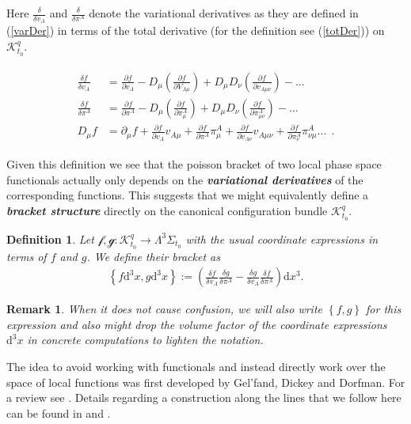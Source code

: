\documentclass[a4paper,12pt, DIV=14, BCOR=5mm, twoside, headsepline, numbers=noenddot]{scrbook}
\newtheorem{definition}{Definition}[section]
\newtheorem*{remark}{Remark}
\begin{document}
Here $\frac{\delta}{\delta v_A}$ and $\frac{\delta}{\delta \pi^A}$ denote the variational derivatives as they are defined in (\ref{varDer}) in terms of the total derivative (for the definition see (\ref{totDer})) on $\mathcal{K}^q_{t_0}$.

\begin{align}
    \begin{aligned}
    \frac{\delta f}{\delta v_A} &= \frac{\partial f}{\partial v_A} - D_{\mu}(\frac{\partial f}{\partial V_{A\mu}}) + D_{\mu}D_{\nu} (\frac{\partial f}{\partial v_{A\mu\nu}}) - ... \\
    \frac{\delta f}{\delta \pi^A} &= \frac{\partial f}{\partial \pi^A} - D_{\mu}(\frac{\partial f}{\partial \pi^{A}_{\mu}}) + D_{\mu}D_{\nu} (\frac{\partial f}{\partial \pi^{A}_{\mu\nu}}) - ... \\
    D_\mu f &= \partial _\mu f + \frac{\partial f}{\partial v_A} v_{A\mu} + \frac{\partial f}{\partial \pi^A } \pi ^{A}_{ \mu} + \frac{\partial f}{\partial v_{A\nu}} v_{A\mu \nu} + \frac{\partial f}{\partial \pi^{A}_ {\nu}}\pi^{A}_{ \nu \mu} ... \ \ .
    \end{aligned}
\end{align}

Given this definition we see that the poisson bracket of two local phase space functionals actually only depends on the \textit{\textbf{variational derivatives}} of the corresponding functions. This suggests that we might equivalently define a \textit{\textbf{bracket structure}} directly on the canonical configuration bundle $\mathcal{K}^q_{t_0}$.
\begin{definition}
Let $\mathcal{f},\mathcal{g} : \mathcal{K}^q_{t_0} \rightarrow \Lambda^3\Sigma_{t_0} $ with the usual coordinate expressions in terms of $f$ and $g$. We define their bracket as 
\begin{align}
    \left \{ f \mathrm{d}^3x,g\mathrm{d}^3x\right \} := \left ( \frac{\delta f}{\delta v_A} \frac{\delta g}{\delta \pi^A} - \frac{\delta g}{\delta v_A} \frac{\delta f}{\delta \pi^A} \right ) \mathrm{d}x^3  .
\end{align}
\end{definition}
\begin{remark}
When it does not cause confusion, we will also write $\left \{ f ,g\right \}$ for this expression and also might drop the volume factor of the coordinate expressions $\mathrm{d}^3x$ in concrete computations to lighten the notation. 
\end{remark}
The idea to avoid working with functionals and instead directly work over the space of local functions was first developed by Gel'fand, Dickey and Dorfman. For a review see \cite{doi:10.1142/5108}.
Details regarding a construction along the lines that we follow here can be found in \cite{1997hep.th....9164B} and \cite{Barnich1998}. 
\end{document}
